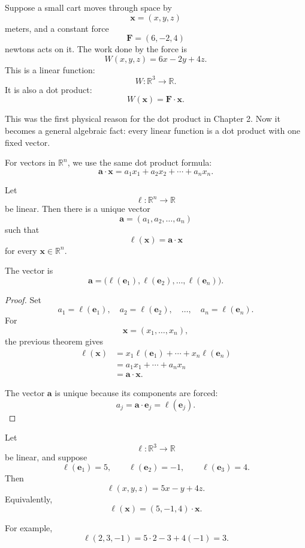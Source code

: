 Suppose a small cart moves through space by
\[
    \mathbf x=(x,y,z)
\]
meters, and a constant force
\[
    \mathbf F=(6,-2,4)
\]
newtons acts on it.  The work done by the force is
\[
    W(x,y,z)=6x-2y+4z.
\]
This is a linear function:
\[
    W:\mathbb R^3\to\mathbb R.
\]
It is also a dot product:
\[
    W(\mathbf x)=\mathbf F\cdot\mathbf x.
\]

This was the first physical reason for the dot product in Chapter 2.  Now it becomes a
general algebraic fact: every linear function is a dot product with one fixed vector.

For vectors in \(\mathbb R^n\), we use the same dot product formula:
\[
    \mathbf a\cdot\mathbf x
    =
    a_1x_1+a_2x_2+\cdots+a_nx_n.
\]

\begin{theorem}
Let
\[
    \ell:\mathbb R^n\to\mathbb R
\]
be linear.  Then there is a unique vector
\[
    \mathbf a=(a_1,a_2,\ldots,a_n)
\]
such that
\[
\boxed{
    \ell(\mathbf x)=\mathbf a\cdot\mathbf x
}
\]
for every \(\mathbf x\in\mathbb R^n\).

The vector is
\[
\boxed{
    \mathbf a=
    \bigl(\ell(\mathbf e_1),\ell(\mathbf e_2),\ldots,\ell(\mathbf e_n)\bigr).
}
\]
\end{theorem}

\begin{proof}
Set
\[
    a_1=\ell(\mathbf e_1),\quad
    a_2=\ell(\mathbf e_2),\quad
    \ldots,\quad
    a_n=\ell(\mathbf e_n).
\]
For
\[
    \mathbf x=(x_1,\ldots,x_n),
\]
the previous theorem gives
\[
\begin{aligned}
\ell(\mathbf x)
&=
x_1\ell(\mathbf e_1)+\cdots+x_n\ell(\mathbf e_n)\\
&=
a_1x_1+\cdots+a_nx_n\\
&=
\mathbf a\cdot\mathbf x.
\end{aligned}
\]

The vector \(\mathbf a\) is unique because its components are forced:
\[
    a_j=\mathbf a\cdot\mathbf e_j=\ell(\mathbf e_j).
\]
\end{proof}

\begin{example}
Let
\[
    \ell:\mathbb R^3\to\mathbb R
\]
be linear, and suppose
\[
    \ell(\mathbf e_1)=5,\qquad
    \ell(\mathbf e_2)=-1,\qquad
    \ell(\mathbf e_3)=4.
\]
Then
\[
    \ell(x,y,z)=5x-y+4z.
\]
Equivalently,
\[
    \ell(\mathbf x)=(5,-1,4)\cdot\mathbf x.
\]

For example,
\[
    \ell(2,3,-1)
    =
    5\cdot2-3+4(-1)
    =
    3.
\]
\end{example}

